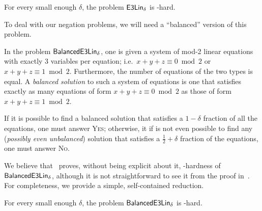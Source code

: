 \documentclass[a4paper,11pt, DIV=11]{scrartcl}
\DeclareMathOperator{\elin}{\textnormal{\textsf{E3Lin}}}
\DeclareMathOperator{\belin}{\textnormal{\textsf{BalancedE3Lin}}}
\theoremstyle{plain}
\theoremstyle{definition}
\begin{document}
\begin{theorem}
    For every small enough $\delta$, the problem $\elin_\delta$ is \NP-hard.
\end{theorem}

To deal with our negation problems, we will need a ``balanced'' version of this problem.

\begin{definition}
    In the problem $\belin_\delta$, one is given a system of mod-2 linear equations with exactly 3 variables per equation; i.e.~$x + y + z \equiv 0 \bmod 2$ or $x + y + z \equiv 1 \bmod 2$. Furthermore, the number of equations of the two types is equal. 
    A \emph{balanced solution} to such a system of equations is one that satisfies exactly as many equations of form $x + y + z \equiv 0 \bmod 2$ as those of form $ x + y + z \equiv 1 \bmod 2$.
    
    If it is possible to find a balanced solution that satisfies a $1 - \delta$ fraction of all the equations, one must answer \textsc{Yes}; otherwise, it if is not even possible to find any (\emph{possibly even unbalanced}) solution that satisfies a $\frac{1}{2} + \delta$ fraction of the equations, one must answer \textsc{No}.
\end{definition}

We believe 
that~\cite{Hastad01} proves, without being explicit about it, \NP-hardness of $\belin_\delta$, although it is not straightforward to see it from the proof in~\cite{Hastad01}. For completeness, we provide a simple, self-contained reduction.

\begin{lemma}\label{lem:source}
    For every small enough $\delta$, the problem $\belin_\delta$ is \NP-hard.
\end{lemma}
\end{document}
